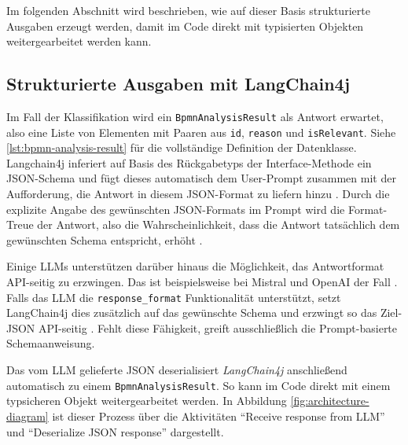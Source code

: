 Im folgenden Abschnitt wird beschrieben, wie auf dieser Basis strukturierte Ausgaben erzeugt werden, damit im Code direkt mit typisierten Objekten weitergearbeitet werden kann.

\subsection*{Strukturierte Ausgaben mit LangChain4j}

Im Fall der Klassifikation wird ein \texttt{BpmnAnalysisResult} als Antwort erwartet, also eine Liste von Elementen mit Paaren aus \texttt{id}, \texttt{reason} und \texttt{isRelevant}. Siehe \ref{lst:bpmn-analysis-result} für die vollständige Definition der Datenklasse. Langchain4j inferiert auf Basis des Rückgabetyps der Interface-Methode ein JSON-Schema und fügt dieses automatisch dem User-Prompt zusammen mit der Aufforderung, die Antwort in diesem JSON-Format zu liefern hinzu \cite{langchain4j-ai-services}. Durch die explizite Angabe des gewünschten JSON-Formats im Prompt wird die Format-Treue der Antwort, also die Wahrscheinlichkeit, dass die Antwort tatsächlich dem gewünschten Schema entspricht, erhöht \cite{liu2023prompting}.

Einige \acp{LLM} unterstützen darüber hinaus die Möglichkeit, das Antwortformat API-seitig zu erzwingen. Das ist beispielsweise bei Mistral und OpenAI der Fall \cite{mistralai_structured_output, openai_structured_output}.
Falls das \ac{LLM} die \texttt{response\_format} Funktionalität unterstützt, setzt LangChain4j dies zusätzlich auf das gewünschte Schema und erzwingt so das Ziel-JSON API-seitig \cite{langchain4j-ai-services}. Fehlt diese Fähigkeit, greift ausschließlich die Prompt-basierte Schemaanweisung.

Das vom \ac{LLM} gelieferte JSON deserialisiert \emph{LangChain4j} anschließend automatisch zu einem \texttt{BpmnAnalysisResult}. So kann im Code direkt mit einem typsicheren Objekt weitergearbeitet werden. In Abbildung \ref{fig:architecture-diagram} ist dieser Prozess über die Aktivitäten \enquote{Receive response from LLM} und \enquote{Deserialize JSON response} dargestellt.
